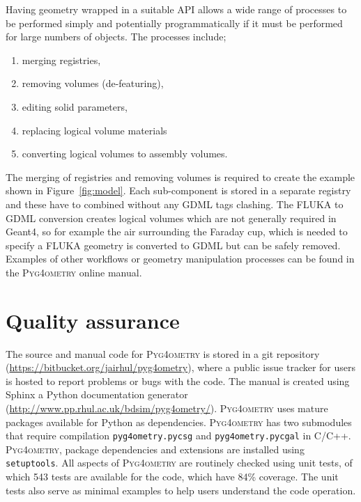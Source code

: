 \documentclass[final,5p,times,twocolumn]{elsarticle}
\newcommand{\pyinline}[1]{\lstinline[postbreak={}]{#1}}
\newcommand{\PYGEOMETRY}{\textsc{Pyg4ometry}}
\begin{document}
Having geometry wrapped in a suitable API allows a wide range of processes to be performed simply and potentially 
programmatically if it must be performed for large numbers of objects. The processes include; 
\begin{enumerate}
\item merging registries, 
\item removing volumes (de-featuring),
\item editing solid parameters,
\item replacing logical volume materials 
\item converting logical volumes to assembly volumes.
\end{enumerate}
The merging of registries and removing volumes is required to create the example shown in Figure~\ref{fig:model}. 
Each sub-component is stored in a separate registry and these have to combined without any GDML tags clashing. 
The FLUKA to GDML conversion creates logical volumes which are not generally required in Geant4, so for example
the air surrounding the Faraday cup, which is needed to specify a FLUKA geometry is converted to GDML but can be 
safely removed. Examples of other workflows or geometry manipulation processes can be found in 
the \PYGEOMETRY{} online manual.

\section{Quality assurance}
The source and manual code for \PYGEOMETRY{} is stored in a git repository (\url{https://bitbucket.org/jairhul/pyg4ometry}), 
where a public issue tracker for users is hosted to report problems or bugs with the code. The manual is created using Sphinx a 
Python documentation generator (\url{http://www.pp.rhul.ac.uk/bdsim/pyg4ometry/}). \PYGEOMETRY{} uses mature packages 
available for Python as dependencies. \PYGEOMETRY{} has  two submodules that require compilation \pyinline{pyg4ometry.pycsg} 
and \pyinline{pyg4ometry.pycgal} in C/C++. \PYGEOMETRY{}, package dependencies and extensions are installed using 
\pyinline{setuptools}. All aspects of \PYGEOMETRY{} are routinely checked using unit tests, of which 543 tests are available 
for the code, which have 84\% coverage. The unit tests also serve as minimal examples to help users understand the code operation.
\end{document}
